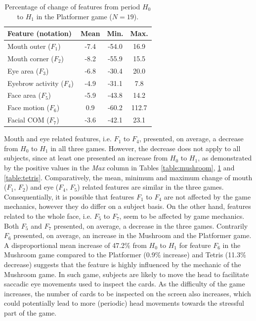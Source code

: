\begin{table}
    \caption{Percentage of change of features from period $H_0$ to $H_1$ in the Platformer game ($N=19$).}
    \label{table:platformer}
    \centering
    \begin{threeparttable}
        \begin{tabular}{lccc}
            \toprule%
                \textbf{Feature (notation)} & \textbf{Mean} & \textbf{Min.} & \textbf{Max.} \\
            \midrule%
                Mouth outer ($F_1$)      & -7.4 & -54.0 & 16.9  \\
                Mouth corner ($F_2$)     & -8.2 & -55.9 & 15.5  \\
                Eye area ($F_3$)         & -6.8 & -30.4 & 20.0  \\
                Eyebrow activity ($F_4$) & -4.9 & -31.1 & 7.8   \\
                Face area ($F_5$)        & -5.9 & -43.8 & 14.2  \\
                Face motion ($F_6$)      & 0.9  & -60.2 & 112.7 \\
                Facial COM ($F_7$)       & -3.6 & -42.1 & 23.1  \\
            \bottomrule%
        \end{tabular}
        \begin{tablenotes}
          \small
          \item[]{}
        \end{tablenotes}
    \end{threeparttable}
\end{table}

Mouth and eye related features, i.e. $F_1$ to $F_4$, presented, on average, a decrease from $H_0$ to $H_1$ in all three games. However, the decrease does not apply to all subjects, since at least one presented an increase from $H_0$ to $H_1$, as demonstrated by the positive values in the \textit{Max} column in Tables \ref{table:mushroom}, \ref{table:platformer} and \ref{table:tetris}. Comparatively, the mean, minimum and maximum change of mouth ($F_1$, $F_2$) and eye ($F_4$, $F_5$) related features are similar in the three games. Consequentially, it is possible that features $F_1$ to $F_4$ are not affected by the game mechanics, however they do differ on a subject basis. On the other hand, features related to the whole face, i.e. $F_5$ to $F_7$, seem to be affected by game mechanics. Both $F_5$ and $F_7$ presented, on average, a decrease in the three games. Contrarily $F_6$ presented, on average, an increase in the Mushroom and the Platformer game. A disproportional mean increase of 47.2\% from $H_0$ to $H_1$ for feature $F_6$ in the Mushroom game compared to the Platformer (0.9\% increase) and Tetris (11.3\% decrease) suggests that the feature is highly influenced by the mechanic of the Mushroom game. In such game, subjects are likely to move the head to facilitate saccadic eye movements used to inspect the cards. As the difficulty of the game increases, the number of cards to be inspected on the screen also increases, which could potentially lead to more (periodic) head movements towards the stressful part of the game.

